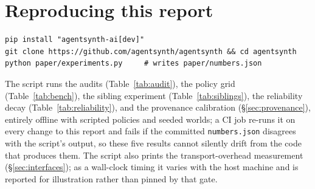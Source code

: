 \documentclass[11pt]{article}
\begin{document}
\section{Reproducing this report}\label{app:repro}

\begin{lstlisting}
pip install "agentsynth-ai[dev]"
git clone https://github.com/agentsynth/agentsynth && cd agentsynth
python paper/experiments.py     # writes paper/numbers.json
\end{lstlisting}

The script runs the audits (Table~\ref{tab:audit}), the policy grid
(Table~\ref{tab:bench}), the sibling experiment (Table~\ref{tab:siblings}),
the reliability decay (Table~\ref{tab:reliability}), and the provenance
calibration (\S\ref{sec:provenance}), entirely offline with scripted policies
and seeded worlds; a CI job re-runs it on every change to this report and
fails if the committed \texttt{numbers.json} disagrees with the script's
output, so these five results cannot silently drift from the code that
produces them. The script also prints the transport-overhead measurement
(\S\ref{sec:interfaces}); as a wall-clock timing it varies with the host
machine and is reported for illustration rather than pinned by that gate.
\end{document}
